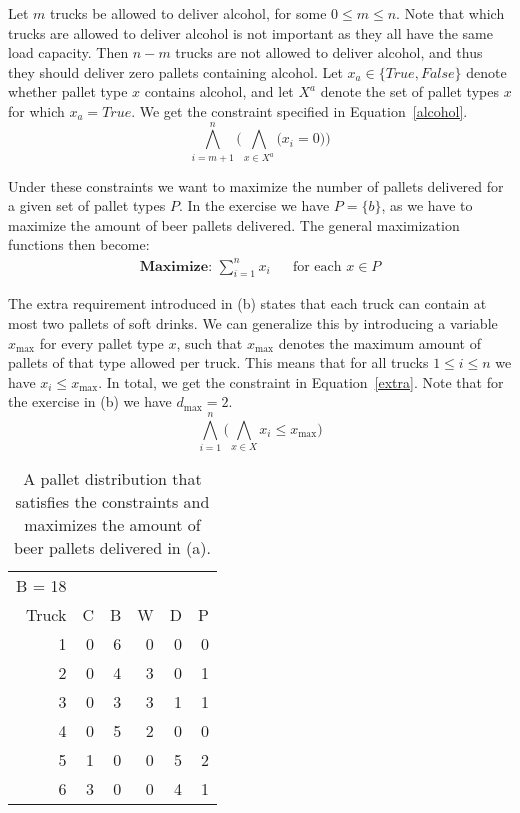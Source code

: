 Let $m$ trucks be allowed to deliver alcohol, for some $0 \leq m \leq n$. Note that which trucks are allowed to deliver alcohol is not important as they all have the same load capacity. Then $n - m$ trucks are not allowed to deliver alcohol, and thus they should deliver zero pallets containing alcohol. Let $x_a \in \{\textit{True}, \textit{False}\}$ denote whether pallet type $x$ contains alcohol, and let $X^{a}$ denote the set of pallet types $x$ for which $x_a = \textit{True}$. We get the constraint specified in Equation~\ref{alcohol}.
\begin{equation}
    \label{alcohol}
    \bigwedge^n_{i=m+1} \bigg(\bigwedge_{x \in X^a} \big( x_i = 0 \big)\bigg)
\end{equation}

Under these constraints we want to maximize the number of pallets delivered for a given set of pallet types $P$. In the exercise we have $P = \{b\}$, as we have to maximize the amount of beer pallets delivered. The general maximization functions then become:
\begin{equation}
    \begin{aligned}
    \textbf{Maximize: } \sum^n_{i=1} x_i && \text{for each }x \in P
    \end{aligned}
\end{equation}

The extra requirement introduced in (b) states that each truck can contain at most two pallets of soft drinks. We can generalize this by introducing a variable $x_{\max}$ for every pallet type $x$, such that $x_{\max}$ denotes the maximum amount of pallets of that type allowed per truck. This means that for all trucks $1 \leq i \leq n$ we have $x_i \leq x_{\max}$. In total, we get the constraint in Equation~\ref{extra}. Note that for the exercise in (b) we have $d_{\max} = 2$.
\begin{equation}
    \label{extra}
    \bigwedge^n_{i=1}\bigg( \bigwedge_{x \in X} x_i \leq x_{\max}\bigg)
\end{equation}




\begin{table}[!ht]
  \begin{tabular}{r | r r r r r}
    B = 18\\
    Truck &  C &  B &  W &  D &  P\\\hline
        1 &  0 &  6 &  0 &  0 &  0\\
        2 &  0 &  4 &  3 &  0 &  1\\
        3 &  0 &  3 &  3 &  1 &  1\\
        4 &  0 &  5 &  2 &  0 &  0\\
        5 &  1 &  0 &  0 &  5 &  2\\
        6 &  3 &  0 &  0 &  4 &  1\\
  \end{tabular}
  \caption{A pallet distribution that satisfies the constraints and maximizes the amount of beer pallets delivered in (a).}
  \label{tab:1_table}
\end{table}
